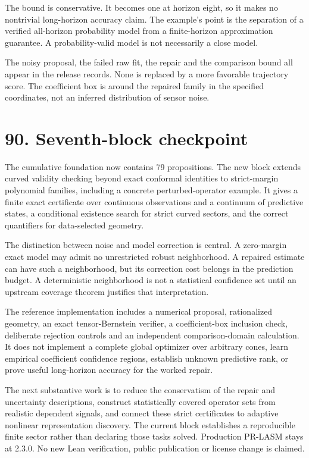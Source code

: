 \documentclass[11pt,letterpaper]{article}
\begin{document}
The bound is conservative. It becomes one at horizon eight, so it makes
no nontrivial long-horizon accuracy claim. The example's point is the
separation of a verified all-horizon probability model from a
finite-horizon approximation guarantee. A probability-valid model is not
necessarily a close model.

The noisy proposal, the failed raw fit, the repair and the comparison
bound all appear in the release records. None is replaced by a more
favorable trajectory score. The coefficient box is around the repaired
family in the specified coordinates, not an inferred distribution of
sensor noise.

\section{90. Seventh-block checkpoint}\label{seventh-block-checkpoint}

The cumulative foundation now contains 79 propositions. The new block
extends curved validity checking beyond exact conformal identities to
strict-margin polynomial families, including a concrete
perturbed-operator example. It gives a finite exact certificate over
continuous observations and a continuum of predictive states, a
conditional existence search for strict curved sectors, and the correct
quantifiers for data-selected geometry.

The distinction between noise and model correction is central. A
zero-margin exact model may admit no unrestricted robust neighborhood. A
repaired estimate can have such a neighborhood, but its correction cost
belongs in the prediction budget. A deterministic neighborhood is not a
statistical confidence set until an upstream coverage theorem justifies
that interpretation.

The reference implementation includes a numerical proposal, rationalized
geometry, an exact tensor-Bernstein verifier, a coefficient-box
inclusion check, deliberate rejection controls and an independent
comparison-domain calculation. It does not implement a complete global
optimizer over arbitrary cones, learn empirical coefficient confidence
regions, establish unknown predictive rank, or prove useful long-horizon
accuracy for the worked repair.

The next substantive work is to reduce the conservatism of the repair
and uncertainty descriptions, construct statistically covered operator
sets from realistic dependent signals, and connect these strict
certificates to adaptive nonlinear representation discovery. The current
block establishes a reproducible finite sector rather than declaring
those tasks solved. Production PR-LASM stays at 2.3.0. No new Lean
verification, public publication or license change is claimed.
\end{document}
